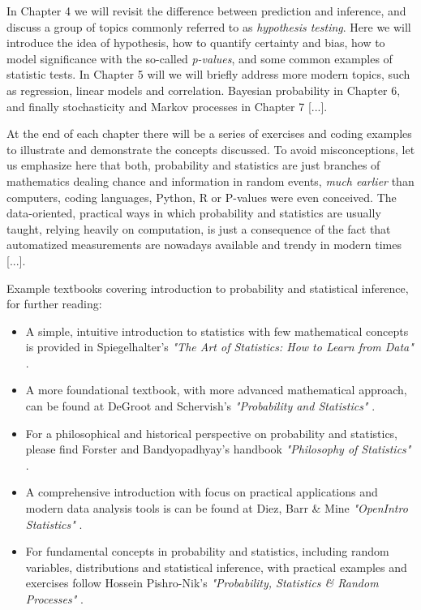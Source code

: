 \documentclass{book}
\begin{document}
\medskip

In Chapter 4 we will revisit the difference between prediction and inference, and discuss a group of topics commonly referred to as \textit{hypothesis testing}. Here we will introduce the idea of hypothesis, how to quantify certainty and bias, how to model significance with the so-called \textit{p-values}, and some common examples of statistic tests. In Chapter 5 will we will briefly address more modern topics, such as regression, linear models and correlation. Bayesian probability in Chapter 6, and finally stochasticity and Markov processes in Chapter 7 [...].

\medskip

At the end of each chapter there will be a series of exercises and coding examples to illustrate and demonstrate the concepts discussed. To avoid misconceptions, let us emphasize here that both, probability and statistics are just branches of mathematics dealing chance and information in random events, \textit{much earlier} than computers, coding languages, Python, R or P-values were even conceived. The data-oriented, practical ways in which probability and statistics are usually taught, relying heavily on computation, is just a consequence of the fact that automatized measurements are nowadays available and trendy in modern times [...].

\medskip

Example textbooks covering introduction to probability and statistical inference, for further reading:

\begin{itemize}
\item A simple, intuitive introduction to statistics with few mathematical concepts is provided in Spiegelhalter's \textit{"The Art of Statistics: How to Learn from Data"} \cite{spiegelhalter2019art}. 
\item A more foundational textbook, with more advanced mathematical approach, can be found at DeGroot and Schervish's \textit{"Probability and Statistics"} \cite{degroot2012probability}.   
\item For a philosophical and historical perspective on probability and statistics, please find Forster and Bandyopadhyay's handbook \textit{"Philosophy of Statistics"} \cite{bandyopadhyay2011philosophy}.
\item A comprehensive introduction with focus on practical applications and modern data analysis tools is can be found at Diez, Barr \& Mine \textit{"OpenIntro Statistics"} \cite{openintro2025}.
\item For fundamental concepts in probability and statistics, including random variables, distributions and statistical inference, with practical examples and exercises follow Hossein Pishro-Nik's \textit{"Probability, Statistics \& Random Processes"} \cite{pishronik2014introduction}.
\end{itemize}
\end{document}
